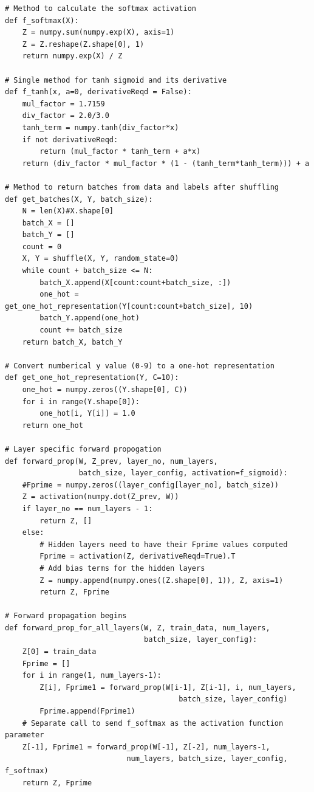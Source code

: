 \documentclass{article}
\begin{document}
\begin{lstlisting}
# Method to calculate the softmax activation
def f_softmax(X):
    Z = numpy.sum(numpy.exp(X), axis=1)
    Z = Z.reshape(Z.shape[0], 1)
    return numpy.exp(X) / Z

# Single method for tanh sigmoid and its derivative
def f_tanh(x, a=0, derivativeReqd = False):
    mul_factor = 1.7159
    div_factor = 2.0/3.0
    tanh_term = numpy.tanh(div_factor*x)
    if not derivativeReqd:
        return (mul_factor * tanh_term + a*x)
    return (div_factor * mul_factor * (1 - (tanh_term*tanh_term))) + a

# Method to return batches from data and labels after shuffling        
def get_batches(X, Y, batch_size):
    N = len(X)#X.shape[0]
    batch_X = []
    batch_Y = []
    count = 0
    X, Y = shuffle(X, Y, random_state=0)
    while count + batch_size <= N:
        batch_X.append(X[count:count+batch_size, :])
        one_hot = get_one_hot_representation(Y[count:count+batch_size], 10)
        batch_Y.append(one_hot)
        count += batch_size
    return batch_X, batch_Y

# Convert numberical y value (0-9) to a one-hot representation    
def get_one_hot_representation(Y, C=10):
    one_hot = numpy.zeros((Y.shape[0], C))
    for i in range(Y.shape[0]):
        one_hot[i, Y[i]] = 1.0
    return one_hot

# Layer specific forward propogation
def forward_prop(W, Z_prev, layer_no, num_layers, 
                 batch_size, layer_config, activation=f_sigmoid):
    #Fprime = numpy.zeros((layer_config[layer_no], batch_size))   
    Z = activation(numpy.dot(Z_prev, W))
    if layer_no == num_layers - 1:
        return Z, []
    else:
        # Hidden layers need to have their Fprime values computed
        Fprime = activation(Z, derivativeReqd=True).T
        # Add bias terms for the hidden layers
        Z = numpy.append(numpy.ones((Z.shape[0], 1)), Z, axis=1)
        return Z, Fprime

# Forward propagation begins
def forward_prop_for_all_layers(W, Z, train_data, num_layers,  
                                batch_size, layer_config):
    Z[0] = train_data
    Fprime = []
    for i in range(1, num_layers-1):
        Z[i], Fprime1 = forward_prop(W[i-1], Z[i-1], i, num_layers, 
                                        batch_size, layer_config)
        Fprime.append(Fprime1)
    # Separate call to send f_softmax as the activation function parameter
    Z[-1], Fprime1 = forward_prop(W[-1], Z[-2], num_layers-1, 
                            num_layers, batch_size, layer_config, f_softmax)
    return Z, Fprime


\end{lstlisting}
\end{document}

